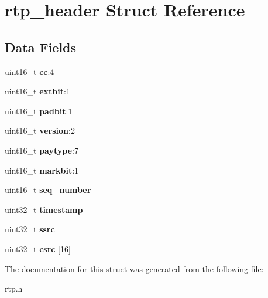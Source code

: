 \section{rtp\+\_\+header Struct Reference}
\label{structrtp__header}
\subsection*{Data Fields}
\begin{DoxyCompactItemize}
\item 
\mbox{\label{structrtp__header_a8e4b59ed46d0a521aeebed80e68139b0}} 
uint16\+\_\+t {\bfseries cc}\+:4
\item 
\mbox{\label{structrtp__header_a1f857798b02b2cf4c60188b34d244c52}} 
uint16\+\_\+t {\bfseries extbit}\+:1
\item 
\mbox{\label{structrtp__header_aacd3b11e46cb1ce8ae7009a6aa5bdd73}} 
uint16\+\_\+t {\bfseries padbit}\+:1
\item 
\mbox{\label{structrtp__header_ae5aef95491a29cc773b26db605560028}} 
uint16\+\_\+t {\bfseries version}\+:2
\item 
\mbox{\label{structrtp__header_afddba7d3abfc26bfcc2ec36fd7ed3a7f}} 
uint16\+\_\+t {\bfseries paytype}\+:7
\item 
\mbox{\label{structrtp__header_a68bcde87c50cfe8183bedadfc030c2ad}} 
uint16\+\_\+t {\bfseries markbit}\+:1
\item 
\mbox{\label{structrtp__header_ace420e52b29a943519da96bf07c8fb89}} 
uint16\+\_\+t {\bfseries seq\+\_\+number}
\item 
\mbox{\label{structrtp__header_a392b631ee1eea2a285c8d91ffa4d7bb4}} 
uint32\+\_\+t {\bfseries timestamp}
\item 
\mbox{\label{structrtp__header_ac6307a27e70b53784832ba5cc92ad8cd}} 
uint32\+\_\+t {\bfseries ssrc}
\item 
\mbox{\label{structrtp__header_aa06a3e4762596d971f53b7b2fd4040b4}} 
uint32\+\_\+t {\bfseries csrc} [16]
\end{DoxyCompactItemize}


The documentation for this struct was generated from the following file\+:\begin{DoxyCompactItemize}
\item 
rtp.\+h\end{DoxyCompactItemize}
